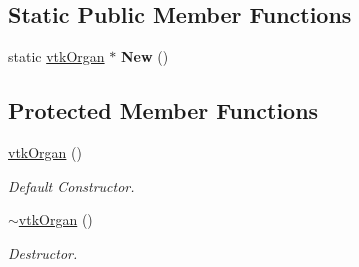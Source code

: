 \subsection*{Static Public Member Functions}
\begin{DoxyCompactItemize}
\item 
\hypertarget{classvtkOrgan_a34716ea8537b1c15648ef97088b2d946}{
static \hyperlink{classvtkOrgan}{vtkOrgan} $\ast$ {\bfseries New} ()}
\label{classvtkOrgan_a34716ea8537b1c15648ef97088b2d946}

\end{DoxyCompactItemize}
\subsection*{Protected Member Functions}
\begin{DoxyCompactItemize}
\item 
\hypertarget{classvtkOrgan_a8063d5da0d5cb2a62b4c0305f0ae279c}{
\hyperlink{classvtkOrgan_a8063d5da0d5cb2a62b4c0305f0ae279c}{vtkOrgan} ()}
\label{classvtkOrgan_a8063d5da0d5cb2a62b4c0305f0ae279c}

\begin{DoxyCompactList}\small\item\em Default Constructor. \item\end{DoxyCompactList}\item 
\hypertarget{classvtkOrgan_ad8e22de8bd62a7a2bd4ea5f84b9ab52e}{
\hyperlink{classvtkOrgan_ad8e22de8bd62a7a2bd4ea5f84b9ab52e}{$\sim$vtkOrgan} ()}
\label{classvtkOrgan_ad8e22de8bd62a7a2bd4ea5f84b9ab52e}

\begin{DoxyCompactList}\small\item\em Destructor. \item\end{DoxyCompactList}\end{DoxyCompactItemize}
